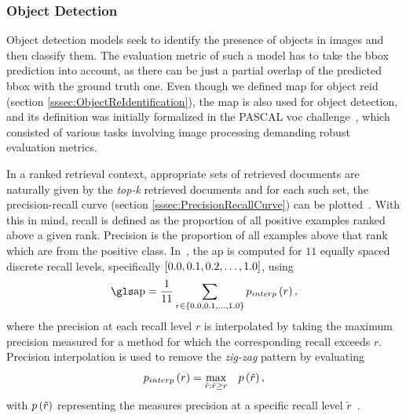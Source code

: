 \subsubsection{Object Detection}

Object detection models seek to identify the presence of objects in images and then classify them. The evaluation metric of such a model has to take the \gls{bbox} prediction into account, as there can be just a partial overlap of the predicted \gls{bbox} with the ground truth one. Even though we defined \gls{map} for object \gls{reid} (section \ref{sssec:ObjectReIdentification}), the \gls{map} is also used for object detection, and its definition was initially formalized in the PASCAL \gls{voc} challenge~\cite{everingham2010pascalvoc}, which consisted of various tasks involving image processing demanding robust evaluation metrics.

In a ranked retrieval context, appropriate sets of retrieved documents are naturally given by the \emph{top-k} retrieved documents and for each such set, the precision-recall curve (section \ref{sssec:PrecisionRecallCurve}) can be plotted~\cite{salton1983introduction}. With this in mind, recall is defined as the proportion of all positive examples ranked above a given rank. Precision is the proportion of all examples above that rank which are from the positive class. In~\cite{everingham2010pascalvoc}, the \gls{ap} is computed for $11$ equally spaced discrete recall levels, specifically $\left[ {0.0, 0.1, 0.2, \dots, 1.0} \right]$, using
\begin{equation}
    \AP = \frac{1}{11} \sum_{r \in \cbrackets{0.0, 0.1, \dots, 1.0}} \func{p_{interp}}{r},
\end{equation}
where the precision at each recall level $r$ is interpolated by taking the maximum precision measured for a method for which the corresponding recall exceeds $r$. Precision interpolation is used to remove the \emph{zig-zag} pattern by evaluating
\begin{equation}
    {p_{interp}} \left( r \right) = \underset{\tilde{r}:\tilde{r} \geq r}{\max} \quad {p} \left( \tilde{r} \right),
\end{equation}
with ${p} \left( \tilde{r} \right)$ representing the measures precision at a specific recall level $\tilde{r}$~\cite{everingham2010pascalvoc, salton1983introduction}.
